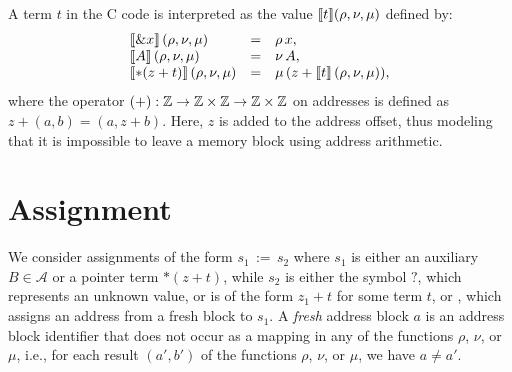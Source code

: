 A term $t$ in the C code is interpreted as the value $\llbracket t\rrbracket(\rho, \nu, \mu)$ defined by:
\[
    \begin{array}{lll}
        \llbracket\& x\rrbracket\,(\rho,\nu,\mu)   & = & \rho\,x,                          \\
        \llbracket A\rrbracket\,(\rho,\nu,\mu)      & = & \nu\,A,                           \\
        \llbracket*(z+t)\rrbracket\,(\rho,\nu,\mu) & = & \mu\,(z+\llbracket t\rrbracket\,(\rho,\nu,\mu)), \\
    \end{array}
\]
where the operator $(+) : \mathbb{Z} \rightarrow \mathbb{Z} \times \mathbb{Z} \rightarrow \mathbb{Z} \times \mathbb{Z}$ on addresses is defined as $z + (a,b) = (a, z+b)$.
Here, $z$ is added to the address offset, thus modeling that it is impossible to leave a memory block using address arithmetic.

\section{Assignment}

We consider assignments of the form $s_1\,{:=}\,s_2$ where $s_1$ is either an auxiliary $B \in \mathcal{A}$ or a pointer term $*(z+t)$, while $s_2$ is either the symbol $?$, which represents an unknown value, or is of the form $z_1 + t$ for some term $t$, or \malloc, which assigns an address from a fresh block to $s_1$.
A \emph{fresh} address block $a$ is an address block identifier that does not occur as a mapping in any of the functions $\rho$, $\nu$, or $\mu$, i.e., for each result $(a',b')$ of the functions $\rho$, $\nu$, or $\mu$, we have $a \neq a'$.

